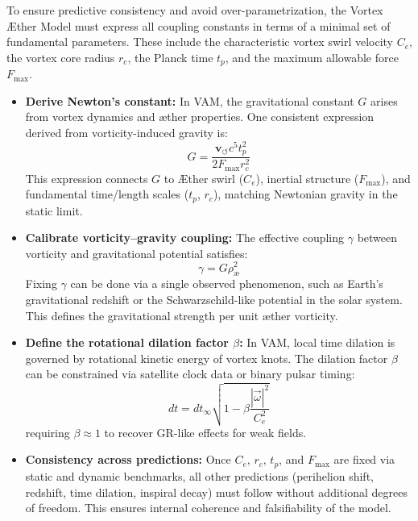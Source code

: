 \documentclass[a4paper, aps,preprint,superscriptaddress, 12pt]{revtex4}
\begin{document}
To ensure predictive consistency and avoid over-parametrization, the Vortex Æther Model must express all coupling constants in terms of a minimal set of fundamental parameters. These include the characteristic vortex swirl velocity $C_e$, the vortex core radius $r_c$, the Planck time $t_p$, and the maximum allowable force $F_{\max}$.

\begin{itemize}
    \item \textbf{Derive Newton's constant:} In VAM, the gravitational constant $G$ arises from vortex dynamics and æther properties. One consistent expression derived from vorticity-induced gravity is:
    \begin{equation}
        G = \frac{\mathbf{v}_{\scriptscriptstyle\boldsymbol{\circlearrowleft}} c^5 t_p^2}{2 F_{\max} r_c^2}
    \end{equation}
    This expression connects $G$ to Æther swirl ($C_e$), inertial structure ($F_{\max}$), and fundamental time/length scales ($t_p$, $r_c$), matching Newtonian gravity in the static limit.

    \item \textbf{Calibrate vorticity–gravity coupling:} The effective coupling $\gamma$ between vorticity and gravitational potential satisfies:
    \begin{equation}
        \gamma = G \rho_\text{\ae}^2
    \end{equation}
    Fixing $\gamma$ can be done via a single observed phenomenon, such as Earth's gravitational redshift or the Schwarzschild-like potential in the solar system. This defines the gravitational strength per unit æther vorticity.

    \item \textbf{Define the rotational dilation factor $\beta$:} In VAM, local time dilation is governed by rotational kinetic energy of vortex knots. The dilation factor $\beta$ can be constrained via satellite clock data or binary pulsar timing:
    \[
    dt = dt_\infty \sqrt{1 - \beta \frac{|\vec{\omega}|^2}{C_e^2}}
    \]
    requiring $\beta \approx 1$ to recover GR-like effects for weak fields.

    \item \textbf{Consistency across predictions:} Once $C_e$, $r_c$, $t_p$, and $F_{\max}$ are fixed via static and dynamic benchmarks, all other predictions (perihelion shift, redshift, time dilation, inspiral decay) must follow without additional degrees of freedom. This ensures internal coherence and falsifiability of the model.
\end{itemize}
\end{document}
